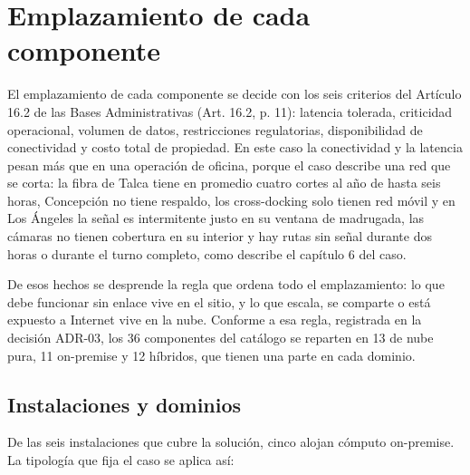 %

\section{Emplazamiento de cada componente}
\label{sec:emplazamiento}

El emplazamiento de cada componente se decide con los seis criterios del Artículo 16.2 de las Bases Administrativas (Art. 16.2, p. 11): latencia tolerada, criticidad operacional, volumen de datos, restricciones regulatorias, disponibilidad de conectividad y costo total de propiedad. En este caso la conectividad y la latencia pesan más que en una operación de oficina, porque el caso describe una red que se corta: la fibra de Talca tiene en promedio cuatro cortes al año de hasta seis horas, Concepción no tiene respaldo, los cross-docking solo tienen red móvil y en Los Ángeles la señal es intermitente justo en su ventana de madrugada, las cámaras no tienen cobertura en su interior y hay rutas sin señal durante dos horas o durante el turno completo, como describe el capítulo 6 del caso.

De esos hechos se desprende la regla que ordena todo el emplazamiento: lo que debe funcionar sin enlace vive en el sitio, y lo que escala, se comparte o está expuesto a Internet vive en la nube. Conforme a esa regla, registrada en la decisión ADR-03, los 36 componentes del catálogo se reparten en 13 de nube pura, 11 on-premise y 12 híbridos, que tienen una parte en cada dominio.

\subsection{Instalaciones y dominios}

De las seis instalaciones que cubre la solución, cinco alojan cómputo on-premise. La tipología que fija el caso se aplica así:

